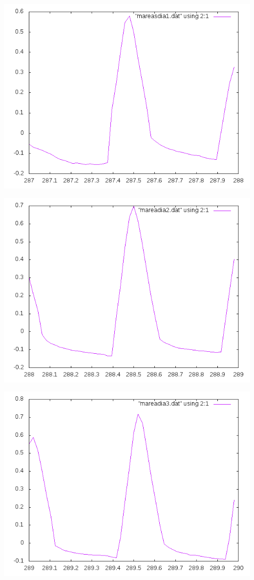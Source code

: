 \documentclass[10pt]{article}
\begin{document}
\begin{center}
   \includegraphics[scale=0.8]{day1.png}
\end{center}

\begin{center}
   \includegraphics[scale=0.8]{day2.png}
\end{center}

\begin{center}
   \includegraphics[scale=0.8]{day3.png}
\end{center}









\end{document}
